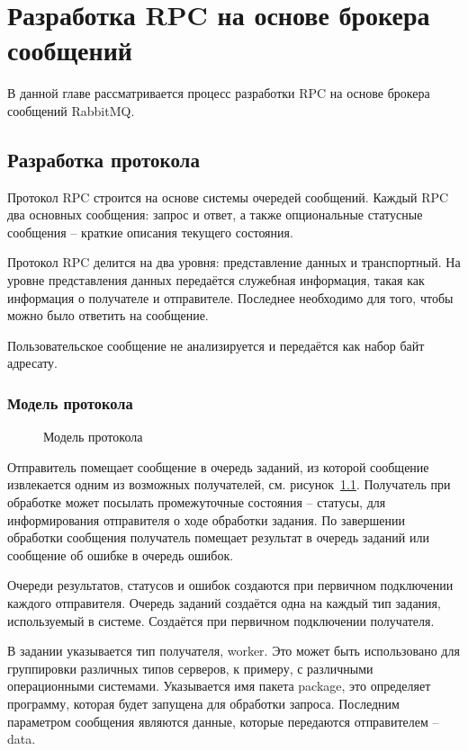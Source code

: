 \chapter{Разработка RPC на основе брокера сообщений}
В данной главе рассматривается процесс разработки RPC на основе
брокера сообщений RabbitMQ.

\section{Разработка протокола}
Протокол RPC строится на основе системы очередей сообщений.
Каждый RPC два основных сообщения: запрос и ответ, а также опциональные
статусные сообщения -- краткие описания текущего состояния.

Протокол RPC делится на два уровня: представление данных и транспортный.
На уровне представления данных передаётся служебная информация, такая как
информация о получателе и отправителе. Последнее необходимо для того,
чтобы можно было ответить на сообщение.

Пользовательское сообщение не анализируется и передаётся как набор байт адресату.

\subsection{Модель протокола}
\begin{figure}[H]
    \centering
    
    \caption{Модель протокола}
    \label{fig:brokerproto}
\end{figure}

Отправитель помещает сообщение в очередь заданий, из которой сообщение
извлекается одним из возможных получателей, см. рисунок~\ref{fig:brokerproto}.
Получатель при обработке может посылать промежуточные состояния -- статусы,
для информирования отправителя о ходе обработки задания. По завершении
обработки сообщения получатель помещает результат в очередь заданий
или сообщение об ошибке в очередь ошибок.

Очереди результатов, статусов и ошибок создаются при первичном подключении
каждого отправителя. Очередь заданий создаётся одна на каждый тип задания,
используемый в системе. Создаётся при первичном подключении получателя.



В задании указывается тип получателя, worker. Это может быть использовано
для группировки различных типов серверов, к примеру, с различными операционными
системами. Указывается имя пакета package, это определяет программу, которая
будет запущена для обработки запроса. Последним параметром сообщения являются
данные, которые передаются отправителем -- data.

